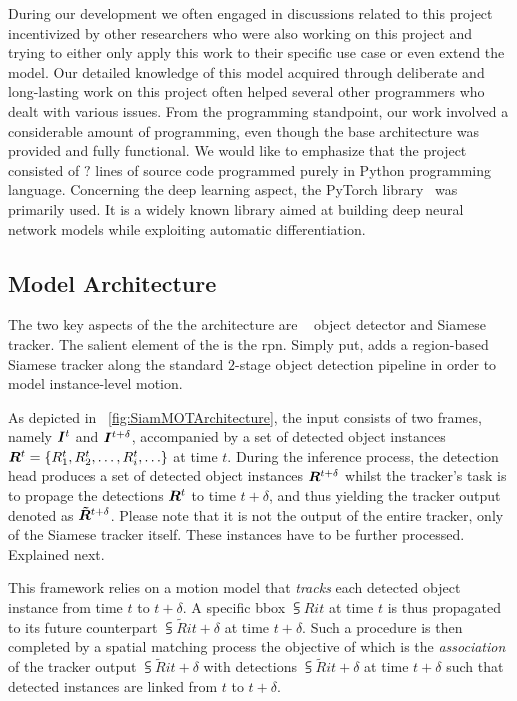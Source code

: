 During our development we often engaged in discussions related to this project incentivized by other researchers who were also working on this project and trying to either only apply this work to their specific use case or even extend the model. Our detailed knowledge of this model acquired through deliberate and long-lasting work on this project often helped several other programmers who dealt with various issues. From the programming standpoint, our work involved a considerable amount of programming, even though the base architecture was provided and fully functional. We would like to emphasize that the project consisted of $?$ lines of source code programmed purely in Python programming language. Concerning the deep learning aspect, the PyTorch library~\cite{paszke2019pytorch} was primarily used. It is a widely known library aimed at building deep neural network models while exploiting automatic differentiation.

\subsection{Model Architecture}

The two key aspects of the the \siammot{} architecture are \fasterrcnn{}~\cite{ren2017fasterrcnn} object detector and Siamese tracker. The salient element of the \fasterrcnn{} is the \gls{rpn}. Simply put, \siammot{} adds a region-based Siamese tracker along the standard $2$-stage object detection pipeline in order to model instance-level motion.

As depicted in \figstr{}~\ref{fig:SiamMOTArchitecture}, the input consists of two frames, namely $\bm{I}^{t}$ and $\bm{I}^{t + \delta}$, accompanied by a set of detected object instances $\bm{R}^{t} = \left\{ {{R}_{1}^{t}, {R}_{2}^{t}, \dots, {R}_{i}^{t}, \dots} \right\}$ at time $t$. During the inference process, the detection head produces a set of detected object instances $\bm{R}^{t + \delta}$ whilst the tracker's task is to propage the detections $\bm{R}^{t}$ to time $t + \delta$, and thus yielding the tracker output denoted as $\bm{\tilde{R}}^{t + \delta}$. Please note that it is not the output of the entire tracker, only of the Siamese tracker itself. These instances have to be further processed. Explained next.

This framework relies on a motion model that \emph{tracks} each detected object instance from time $t$ to $t + \delta$. A specific \gls{bbox} $\subsup{R}{i}{t}$ at time $t$ is thus propagated to its future counterpart $\subsup{\tilde{R}}{i}{t + \delta}$ at time $t + \delta$. Such a procedure is then completed by a spatial matching process the objective of which is the \emph{association} of the tracker output $\subsup{\tilde{R}}{i}{t + \delta}$ with detections $\subsup{\tilde{R}}{i}{t + \delta}$ at time $t + \delta$ such that detected instances are linked from $t$ to $t + \delta$.

